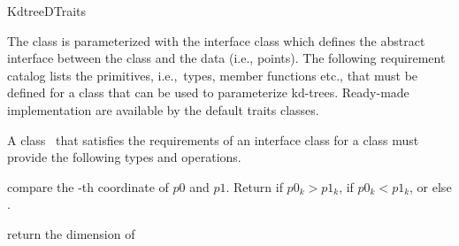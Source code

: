 \begin{ccRefConcept}{KdtreeDTraits}

The   class is  parameterized with the
interface class  which defines the abstract interface
between the  class and the data (i.e., points). The following
requirement catalog lists the primitives, i.e.,~types, member functions
etc., that must be defined for a class that can be used to
parameterize kd-trees. Ready-made implementation are available
by the  default traits classes.

\ccTwo{}{\hspace*{7.1cm}}




    \ccDefinition
    A class \ccClassName\ that satisfies the requirements of an
    interface class for a  class must provide the
    following types and operations. 
  
    \ccTypes
    

    \ccOperations

     {compare the -th coordinate
       of $p0$ and $p1$.  Return  if $p0_k >
       p1_k$,  if $p0_k < p1_k$, or else
       .  }


    {return the dimension of }
\end{ccRefConcept}
